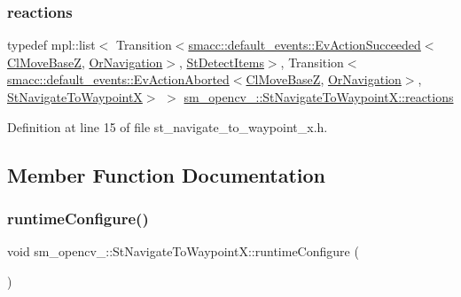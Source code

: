 \subsubsection{\texorpdfstring{reactions}{reactions}}
{\footnotesize\ttfamily typedef mpl\+::list$<$ Transition$<$\hyperlink{structsmacc_1_1default__events_1_1EvActionSucceeded}{smacc\+::default\+\_\+events\+::\+Ev\+Action\+Succeeded}$<$\hyperlink{classcl__move__base__z_1_1ClMoveBaseZ}{Cl\+Move\+BaseZ}, \hyperlink{classsm__opencv__2_1_1OrNavigation}{Or\+Navigation}$>$, \hyperlink{structsm__opencv__2_1_1StDetectItems}{St\+Detect\+Items}$>$, Transition$<$\hyperlink{structsmacc_1_1default__events_1_1EvActionAborted}{smacc\+::default\+\_\+events\+::\+Ev\+Action\+Aborted}$<$\hyperlink{classcl__move__base__z_1_1ClMoveBaseZ}{Cl\+Move\+BaseZ}, \hyperlink{classsm__opencv__2_1_1OrNavigation}{Or\+Navigation}$>$, \hyperlink{structsm__opencv__2_1_1StNavigateToWaypointX}{St\+Navigate\+To\+WaypointX}$>$ $>$ \hyperlink{structsm__opencv__2_1_1StNavigateToWaypointX_a6924bb2373c2e270c16752321e5d6d36}{sm\+\_\+opencv\+\_\+::\+St\+Navigate\+To\+Waypoint\+X\+::reactions}}



Definition at line 15 of file st\+\_\+navigate\+\_\+to\+\_\+waypoint\+\_\+x.\+h.



\subsection{Member Function Documentation}
\mbox{\label{structsm__opencv__2_1_1StNavigateToWaypointX_a824ab82dc564858c7b04c0afdadde16c}} 
\subsubsection{\texorpdfstring{runtime\+Configure()}{runtimeConfigure()}}
{\footnotesize\ttfamily void sm\+\_\+opencv\+\_\+::\+St\+Navigate\+To\+Waypoint\+X\+::runtime\+Configure (\begin{DoxyParamCaption}{ }\end{DoxyParamCaption})\hspace{0.3cm}{\ttfamily [inline]}}




